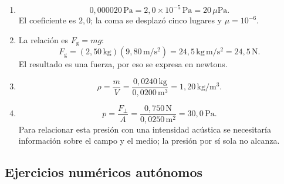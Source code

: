 \begin{enumerate}[label=\textbf{NG\arabic*.},leftmargin=*]
    \item
    \[
        0{,}000020\,\text{Pa}
        =2{,}0\times10^{-5}\,\text{Pa}
        =20\,\mu\text{Pa}.
    \]
    El coeficiente es \(2{,}0\); la coma se desplazó cinco lugares y \(\mu=10^{-6}\).

    \item La relación es \(F_\mathrm{g}=mg\):
    \[
        F_\mathrm{g}
        =(2{,}50\,\text{kg})(9{,}80\,\text{m}/\text{s}^{2})
        =24{,}5\,\text{kg}\,\text{m}/\text{s}^{2}
        =24{,}5\,\text{N}.
    \]
    El resultado es una fuerza, por eso se expresa en newtons.

    \item
    \[
        \rho=\frac{m}{V}
        =\frac{0{,}0240\,\text{kg}}{0{,}0200\,\text{m}^{3}}
        =1{,}20\,\text{kg}/\text{m}^{3}.
    \]

    \item
    \[
        p=\frac{F_\perp}{A}
        =\frac{0{,}750\,\text{N}}{0{,}0250\,\text{m}^{2}}
        =30{,}0\,\text{Pa}.
    \]
    Para relacionar esta presión con una intensidad acústica se necesitaría información sobre el campo y el medio; la presión por sí sola no alcanza.
\end{enumerate}

\subsection*{Ejercicios numéricos autónomos}

